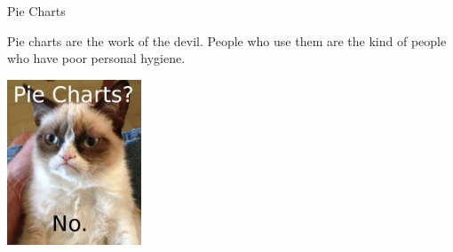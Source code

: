 \begin{frame}{Pie Charts}

  Pie charts are the work of the devil. People who use them are the
  kind of people who have poor personal hygiene. 

  \vfill

  \centerline{\includegraphics[width=4cm]{img/grumpyPieChart}}

  
\end{frame}

